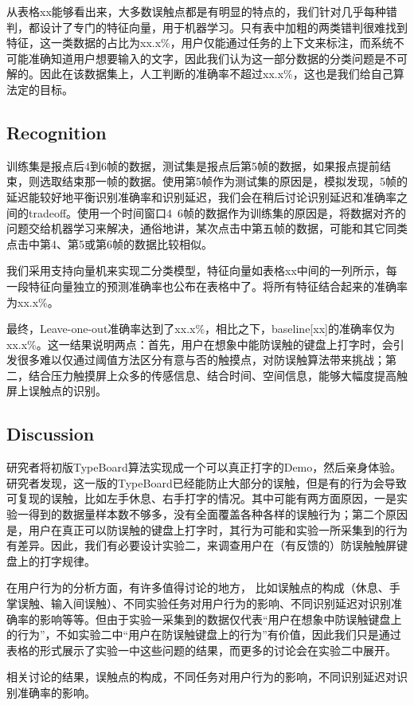 从表格xx能够看出来，大多数误触点都是有明显的特点的，我们针对几乎每种错判，都设计了专门的特征向量，用于机器学习。只有表中加粗的两类错判很难找到特征，这一类数据的占比为xx.x\%，用户仅能通过任务的上下文来标注，而系统不可能准确知道用户想要输入的文字，因此我们认为这一部分数据的分类问题是不可解的。因此在该数据集上，人工判断的准确率不超过xx.x\%，这也是我们给自己算法定的目标。

\subsection{Recognition}

训练集是报点后4到6帧的数据，测试集是报点后第5帧的数据，如果报点提前结束，则选取结束那一帧的数据。使用第5帧作为测试集的原因是，模拟发现，5帧的延迟能较好地平衡识别准确率和识别延迟，我们会在稍后讨论识别延迟和准确率之间的tradeoff。使用一个时间窗口4~6帧的数据作为训练集的原因是，将数据对齐的问题交给机器学习来解决，通俗地讲，某次点击中第五帧的数据，可能和其它同类点击中第4、第5或第6帧的数据比较相似。

我们采用支持向量机来实现二分类模型，特征向量如表格xx中间的一列所示，每一段特征向量独立的预测准确率也公布在表格中了。将所有特征结合起来的准确率为xx.x\%。

最终，Leave-one-out准确率达到了xx.x\%，相比之下，baseline[xx]的准确率仅为xx.x\%。这一结果说明两点：首先，用户在想象中能防误触的键盘上打字时，会引发很多难以仅通过阈值方法区分有意与否的触摸点，对防误触算法带来挑战；第二，结合压力触摸屏上众多的传感信息、结合时间、空间信息，能够大幅度提高触屏上误触点的识别。

\subsection{Discussion}

研究者将初版TypeBoard算法实现成一个可以真正打字的Demo，然后亲身体验。研究者发现，这一版的TypeBoard已经能防止大部分的误触，但是有的行为会导致可复现的误触，比如左手休息、右手打字的情况。其中可能有两方面原因，一是实验一得到的数据量样本数不够多，没有全面覆盖各种各样的误触行为；第二个原因是，用户在真正可以防误触的键盘上打字时，其行为可能和实验一所采集到的行为有差异。因此，我们有必要设计实验二，来调查用户在（有反馈的）防误触触屏键盘上的打字规律。

在用户行为的分析方面，有许多值得讨论的地方， 比如误触点的构成（休息、手掌误触、输入间误触）、不同实验任务对用户行为的影响、不同识别延迟对识别准确率的影响等等。但由于实验一采集到的数据仅代表“用户在想象中防误触键盘上的行为”，不如实验二中“用户在防误触键盘上的行为”有价值，因此我们只是通过表格的形式展示了实验一中这些问题的结果，而更多的讨论会在实验二中展开。

相关讨论的结果，误触点的构成，不同任务对用户行为的影响，不同识别延迟对识别准确率的影响。
